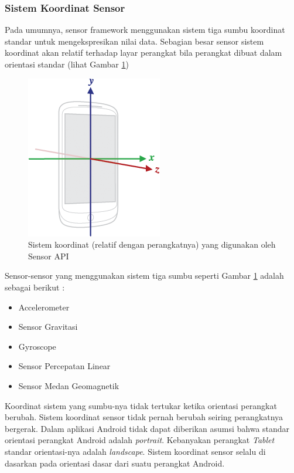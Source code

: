 \subsubsection{Sistem Koordinat Sensor}
\label{sssec:sistem_koordinat_sensor}
Pada umumnya, sensor framework menggunakan sistem tiga sumbu koordinat standar untuk mengekspresikan nilai data. Sebagian besar sensor sistem koordinat akan relatif terhadap layar perangkat bila perangkat dibuat dalam orientasi standar (lihat Gambar \ref{fig:axis-device})
\begin{figure}[htbp]
	\centering
		\includegraphics[scale=1]{Gambar/axis-device.png}
	\caption{Sistem koordinat (relatif dengan perangkatnya) yang digunakan oleh Sensor API}
	\label{fig:axis-device}
\end{figure}
Sensor-sensor yang menggunakan sistem tiga sumbu seperti Gambar \ref{fig:axis-device} adalah sebagai berikut :
\begin{itemize}
	\item Accelerometer
	\item Sensor Gravitasi
	\item Gyroscope
	\item Sensor Percepatan Linear
	\item Sensor Medan Geomagnetik
\end{itemize}
Koordinat sistem yang sumbu-nya tidak tertukar ketika orientasi perangkat berubah. Sistem koordinat sensor tidak pernah berubah seiring perangkatnya bergerak. Dalam aplikasi Android tidak dapat diberikan asumsi bahwa standar orientasi perangkat Android adalah \textit{portrait}. Kebanyakan perangkat \textit{Tablet} standar orientasi-nya adalah \textit{landscape}. Sistem koordinat sensor selalu di dasarkan pada orientasi dasar dari suatu perangkat Android.
